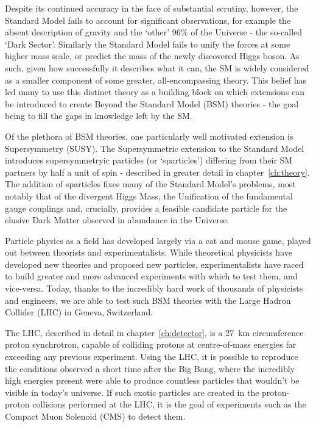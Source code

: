 Despite its continued accuracy in the face of substantial scrutiny, however,
the Standard Model fails to account for significant observations, for example
the absent description of gravity and the `other' 96\% of the
Universe - the so-called `Dark Sector'. Similarly the Standard Model fails to
unify the forces at some higher mass scale, or predict the mass of
the newly discovered Higgs boson. As such, given how successfully it describes
what it can, the SM is widely considered as a smaller component of some greater,
all-encompassing theory. This belief has led many to use this distinct theory as
a building block on which extensions can be introduced to create Beyond the
Standard Model (BSM) theories - the goal being to fill the gaps in knowledge
left by the SM.

Of the plethora of BSM theories, one particularly well motivated extension is
Supersymmetry (SUSY). The Supersymmetric extension to the Standard
Model introduces supersymmetryic particles (or `sparticles') differing from
their SM partners by half a unit of spin - described in greater detail in
chapter~\ref{ch:theory}. The addition of sparticles fixes
many of the Standard Model's problems, most notably that of the
divergent Higgs Mass, the Unification of the fundamental gauge couplings and,
crucially, provides a feasible candidate particle for the elusive Dark Matter
observed in abundance in the Universe.

Particle physics as a field has developed largely via a cat and mouse game,
played out between theorists and experimentalists. While theoretical physicists
have developed new theories and proposed new particles, experimentalists have
raced to build
greater and more advanced experiments with which to test them, and vice-versa.
Today, thanks to the incredibly hard work of thousands of physicists and
engineers, we are able to test such BSM theories with the Large
Hadron Collider (LHC) in Geneva, Switzerland.

The LHC, described in detail in chapter~\ref{ch:detector}, is a 27~km
circumference proton synchrotron, capable of colliding protons
at centre-of-mass energies far exceeding any previous experiment.
Using the LHC, it is possible to reproduce the conditions observed a short time
after the Big Bang, where the incredibly high energies present were able to
produce countless particles that wouldn't be visible in today's universe. If
such exotic particles are created in the proton-proton collisions performed at
the LHC, it is the goal of experiments such as the Compact Muon Solenoid (CMS)
to detect them.

